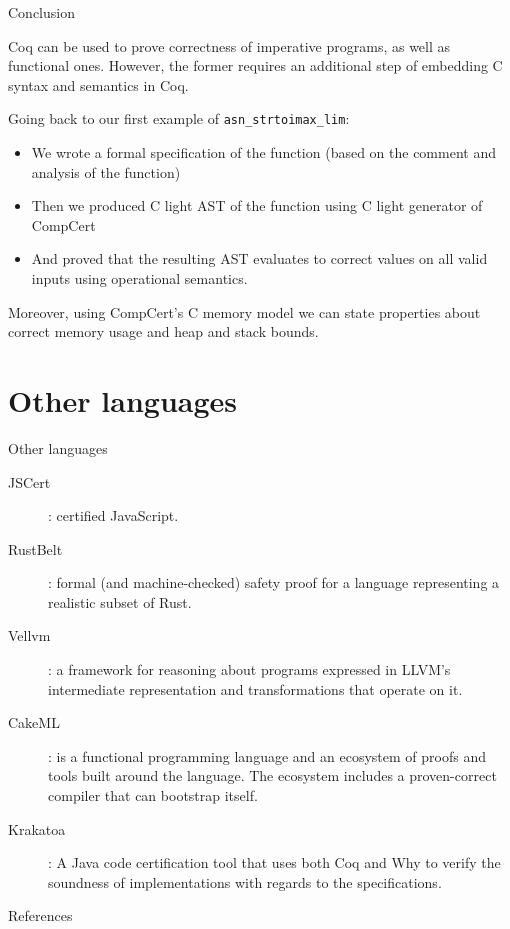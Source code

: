 \documentclass[10pt]{beamer}
\begin{document}
    \begin{frame}{Conclusion}

      Coq can be used to prove correctness of imperative programs, as well as functional ones. However, the former requires an additional step of embedding C syntax and semantics in Coq. 
      
      Going back to our first example of \texttt{asn\_strtoimax\_lim}:
      \begin{itemize}
          \item  We wrote a formal specification of the function (based on the comment and analysis of the function)
          \item Then we produced C light AST of the function using C light generator of CompCert
          \item And proved that the resulting AST evaluates to correct values on all valid inputs using operational semantics. 
            \end{itemize}
            
            Moreover, using CompCert's C memory model we can state properties about correct memory usage and heap and stack bounds.

      \end{frame}

\section{Other languages}

\begin{frame}{Other languages}
 \begin{description}
  \item[JSCert]: certified JavaScript.
  \item[RustBelt]: formal (and machine-checked) safety proof for a language representing a realistic subset of Rust.
  \item[Vellvm]: a framework for reasoning about programs expressed in LLVM's intermediate representation and transformations that operate on it.
  \item[CakeML]: is a functional programming language and an ecosystem of proofs and tools built around the language. The ecosystem includes a proven-correct compiler that can bootstrap itself.
  \item[Krakatoa]: A Java code certification tool that uses both Coq and Why to verify the soundness of implementations with regards to the specifications.
  \end{description}
  \end{frame}

\begin{frame}[allowframebreaks]{References}

  
  

\end{frame}
\end{document}
